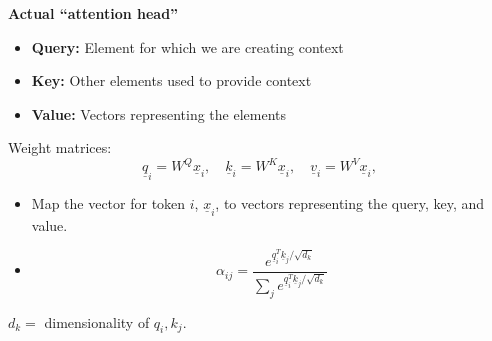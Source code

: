 \begin{definition}
    \textbf{Actual ``attention head''}
\begin{itemize}
    \item \textbf{Query:} Element for which we are creating context
    \item \textbf{Key:} Other elements used to provide context
    \item \textbf{Value:} Vectors representing the elements
\end{itemize}
\vspace{1em}

Weight matrices:
\[
\underline{q}_i = W^Q \underline{x}_i, \quad \underline{k}_i = W^K \underline{x}_i, \quad \underline{v}_i = W^V \underline{x}_i,
\]

\begin{itemize}
    \item Map the vector for token $i$, $\underline{x}_i$, to vectors representing the query, key, and value.
    \item \[
        \alpha_{ij} = \frac{e^{\underline{q}_i^T \underline{k}_j / \sqrt{d_k}}}{\sum_j e^{\underline{q}_i^T \underline{k}_j / \sqrt{d_k}}}
    \]
\end{itemize}

$d_k = $ dimensionality of $q_i, k_j$. %
\end{definition}
